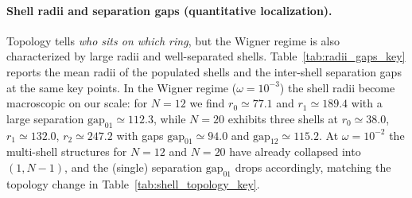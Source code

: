 \documentclass[superscriptaddress,unsortedaddress,amsmath,amssymb,aps]{revtex4-2}
\begin{document}
\paragraph{Shell radii and separation gaps (quantitative localization).}
Topology tells \emph{who sits on which ring}, but the Wigner regime is also characterized by large radii and
well-separated shells. Table~\ref{tab:radii_gaps_key} reports the mean radii of the populated shells and the
inter-shell separation gaps at the same key points. In the Wigner regime ($\omega=10^{-3}$) the shell radii become
macroscopic on our scale: for $N=12$ we find $r_0\simeq 77.1$ and $r_1\simeq 189.4$ with a large separation
$\mathrm{gap}_{01}\simeq 112.3$, while $N=20$ exhibits three shells at $r_0\simeq 38.0$, $r_1\simeq 132.0$,
$r_2\simeq 247.2$ with gaps $\mathrm{gap}_{01}\simeq 94.0$ and $\mathrm{gap}_{12}\simeq 115.2$.
At $\omega=10^{-2}$ the multi-shell structures for $N=12$ and $N=20$ have already collapsed into $(1,N{-}1)$,
and the (single) separation $\mathrm{gap}_{01}$ drops accordingly, matching the topology change in
Table~\ref{tab:shell_topology_key}.
\end{document}
